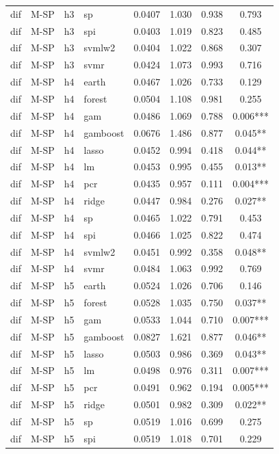\begin{ThreePartTable}
\begin{longtable}[t]{llclcccc}
dif & M-SP & h3 & sp & 0.0407 & 1.030 & 0.938 & 0.793\\
dif & M-SP & h3 & spi & 0.0403 & 1.019 & 0.823 & 0.485\\
dif & M-SP & h3 & svmlw2 & 0.0404 & 1.022 & 0.868 & 0.307\\
dif & M-SP & h3 & svmr & 0.0424 & 1.073 & 0.993 & 0.716\\
\addlinespace
dif & M-SP & h4 & earth & 0.0467 & 1.026 & 0.733 & 0.129\\
dif & M-SP & h4 & forest & 0.0504 & 1.108 & 0.981 & 0.255\\
dif & M-SP & h4 & gam & 0.0486 & 1.069 & 0.788 & 0.006***\\
dif & M-SP & h4 & gamboost & 0.0676 & 1.486 & 0.877 & 0.045**\\
dif & M-SP & h4 & lasso & 0.0452 & 0.994 & 0.418 & 0.044**\\
dif & M-SP & h4 & lm & 0.0453 & 0.995 & 0.455 & 0.013**\\
dif & M-SP & h4 & pcr & 0.0435 & 0.957 & 0.111 & 0.004***\\
dif & M-SP & h4 & ridge & 0.0447 & 0.984 & 0.276 & 0.027**\\
dif & M-SP & h4 & sp & 0.0465 & 1.022 & 0.791 & 0.453\\
dif & M-SP & h4 & spi & 0.0466 & 1.025 & 0.822 & 0.474\\
dif & M-SP & h4 & svmlw2 & 0.0451 & 0.992 & 0.358 & 0.048**\\
dif & M-SP & h4 & svmr & 0.0484 & 1.063 & 0.992 & 0.769\\
\addlinespace
dif & M-SP & h5 & earth & 0.0524 & 1.026 & 0.706 & 0.146\\
dif & M-SP & h5 & forest & 0.0528 & 1.035 & 0.750 & 0.037**\\
dif & M-SP & h5 & gam & 0.0533 & 1.044 & 0.710 & 0.007***\\
dif & M-SP & h5 & gamboost & 0.0827 & 1.621 & 0.877 & 0.046**\\
dif & M-SP & h5 & lasso & 0.0503 & 0.986 & 0.369 & 0.043**\\
dif & M-SP & h5 & lm & 0.0498 & 0.976 & 0.311 & 0.007***\\
dif & M-SP & h5 & pcr & 0.0491 & 0.962 & 0.194 & 0.005***\\
dif & M-SP & h5 & ridge & 0.0501 & 0.982 & 0.309 & 0.022**\\
dif & M-SP & h5 & sp & 0.0519 & 1.016 & 0.699 & 0.275\\
dif & M-SP & h5 & spi & 0.0519 & 1.018 & 0.701 & 0.229\\

\end{longtable}
\end{ThreePartTable}
